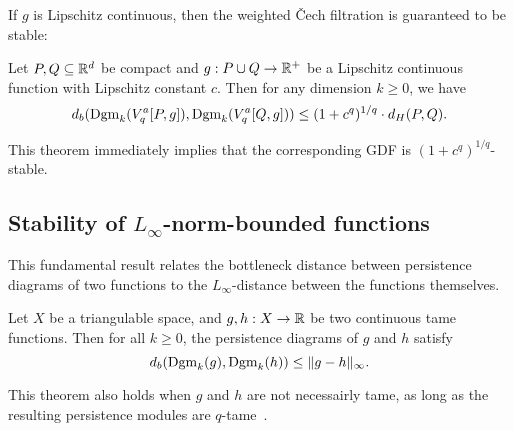 If $g$ is Lipschitz continuous, then the weighted \v{C}ech filtration is
guaranteed to be stable:
\begin{theorem}
    \label{thm:weighted_cech_stability}
    Let $P, Q \subseteq \mathbb{R}^d$ be compact and $g : P \cup Q \to \mathbb{R}^+$ be a
    Lipschitz continuous function with Lipschitz constant $c$. Then for any
    dimension $k \geq 0$, we have
    \begin{equation}
        d_b(\operatorname{Dgm}_k(V^a_q[P, g]), \operatorname{Dgm}_k(V^a_q[Q, g])) \leq (1 + c^q)^{1/q} \cdot d_H(P, Q).
    \end{equation}
\end{theorem}
This theorem immediately implies that the corresponding GDF
is $(1 + c^q)^{1/q}$-stable.

\subsection{Stability of $L_\infty$-norm-bounded functions}

This fundamental result relates the bottleneck distance between persistence
diagrams of two functions to the $L_\infty$-distance between the functions
themselves.

\begin{theorem}
    \label{thm:stability_sup_norm}
    Let $X$ be a triangulable space, and $g, h : X \to \mathbb{R}$ be two continuous
    tame functions. Then for all $k \geq 0$, the persistence diagrams of $g$ and
    $h$ satisfy
    \begin{equation}
        d_b(\operatorname{Dgm}_k(g), \operatorname{Dgm}_k(h)) \leq \lVert g - h\rVert_{\infty}.
    \end{equation}
\end{theorem}
\begin{remark}
    This theorem also holds when $g$ and $h$ are not necessairly tame, as long
    as the resulting persistence modules are
    $q$-tame~\cite{chazal2013structurestabilitypersistencemodules}.
\end{remark}

